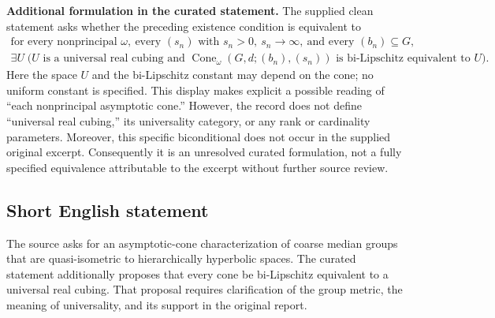 \documentclass[11pt]{article}
\begin{document}
\textbf{Additional formulation in the curated statement.} The supplied clean statement asks whether the preceding existence condition is equivalent to
\[
\begin{gathered}
\text{for every nonprincipal }\omega,\ \text{every }(s_n)\text{ with }s_n>0,\ s_n\to\infty,\ \text{and every }(b_n)\subseteq G,\\
\exists U\;\bigl(U\text{ is a universal real cubing and }
\operatorname{Cone}_{\omega}(G,d;(b_n),(s_n))
\text{ is bi-Lipschitz equivalent to }U\bigr).
\end{gathered}
\]
Here the space \(U\) and the bi-Lipschitz constant may depend on the cone; no uniform constant is specified. This display makes explicit a possible reading of ``each nonprincipal asymptotic cone.'' However, the record does not define ``universal real cubing,'' its universality category, or any rank or cardinality parameters. Moreover, this specific biconditional does not occur in the supplied original excerpt. Consequently it is an unresolved curated formulation, not a fully specified equivalence attributable to the excerpt without further source review.
\subsection{Short English statement}
The source asks for an asymptotic-cone characterization of coarse median groups that are quasi-isometric to hierarchically hyperbolic spaces. The curated statement additionally proposes that every cone be bi-Lipschitz equivalent to a universal real cubing. That proposal requires clarification of the group metric, the meaning of universality, and its support in the original report.
\end{document}

